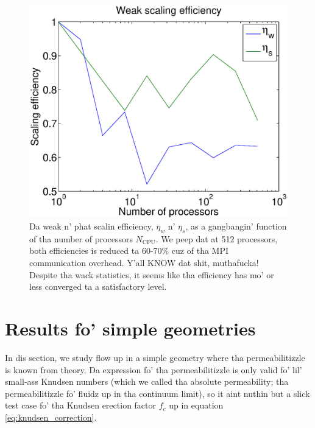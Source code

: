 \begin{figure}[H]
\begin{center}
\includegraphics[width=\textwidth, trim=0cm 0cm 0cm 0cm, clip]{DSMC/figures/scaling.eps}
\end{center}
\caption{Da weak n' phat scalin efficiency, $\eta_w$ n' $\eta_s$, as a gangbangin' function of tha number of processors $N_\text{CPU}$. We peep dat at 512 processors, both efficiencies is reduced ta 60-70\% cuz of tha MPI communication overhead. Y'all KNOW dat shit, muthafucka! Despite tha wack statistics, it seems like tha efficiency has mo' or less converged ta a satisfactory level.}
\label{fig:dsmc_scaling}
\end{figure}

\section{Results fo' simple geometries}
\label{sec:results_for_simple_geometries}
In dis section, we study flow up in a simple geometry where tha permeabilitizzle is known from theory. Da expression fo' tha permeabilitizzle is only valid fo' lil' small-ass Knudsen numbers (which we called tha absolute permeability; tha permeabilitizzle fo' fluidz up in tha continuum limit), so it aint nuthin but a slick test case fo' tha Knudsen erection factor $f_c$ up in equation \eqref{eq:knudsen_correction}. 

